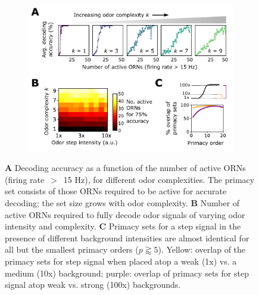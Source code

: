 \documentclass[9pt,twocolumn,twoside,lineno]{pnas-new}
\begin{document}
\begin{figure}[tb]
	\begin{subfigure}[t]{\linewidth}
		\includegraphics[width=\textwidth]{figures/4_primacy_coding}
		\label{fig:primacy_coding_a}	
	\end{subfigure}
	\begin{subfigure}[t]{0\linewidth}
		\label{fig:primacy_coding_b}
	\end{subfigure}
	\begin{subfigure}[t]{0\linewidth}
		\label{fig:primacy_coding_c}
	\end{subfigure}
	\caption{\footnotesize{
	\textbf{A} Decoding accuracy as a function of the number of active ORNs (firing rate~$>$~15 Hz), for different odor complexities. The primacy set consists of those ORNs required to be active for accurate decoding; the set size grows with odor complexity.
	\textbf{B} Number of active ORNs required to fully decode odor signals of varying odor intensity and complexity. 
	\textbf{C} Primacy sets for a step signal in the presence of different background intensities are almost identical for all but the smallest primacy orders  ($p \gtrapprox 5$). Yellow: overlap of the primacy sets for step signal when placed atop a weak (1x) vs. a medium (10x) background; purple: overlap of primacy sets for step signal atop weak vs. strong (100x) backgrounds.
	}}
	\label{fig:primacy_coding}
\end{figure}
\end{document}
